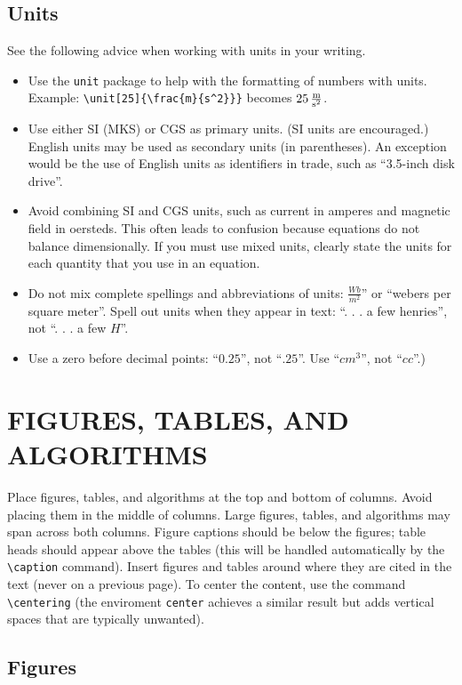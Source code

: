 \documentclass[letterpaper, 10 pt, conference]{ieeeconf}
\begin{document}
\subsection{Units}\label{sec:units}
See the following advice when working with units in your writing.
\begin{itemize}
\item Use the \texttt{unit} package to help with the formatting of
  numbers with units. Example: \verb|\unit[25]{\frac{m}{s^2}}}| becomes $\unit[25]{\frac{m}{s^2}}$.
\item Use either SI (MKS) or CGS as primary units. (SI units are encouraged.) English units may be used as secondary units (in parentheses). An exception would be the use of English units as identifiers in trade, such as ``3.5-inch disk drive''.
\item Avoid combining SI and CGS units, such as current in amperes and magnetic field in oersteds. This often leads to confusion because equations do not balance dimensionally. If you must use mixed units, clearly state the units for each quantity that you use in an equation.
\item Do not mix complete spellings and abbreviations of units: $\unit{\frac{Wb}{m^2}}$'' or ``webers per square meter''. Spell out units when they appear in text: ``. . . a few henries'', not ``. . . a few $\unit{H}$''.
\item Use a zero before decimal points: ``$0.25$'', not ``$.25$''. Use
  ``$\unit{cm^3}$'', not ``$\unit{cc}$''.)
\end{itemize}



\section{FIGURES, TABLES, AND ALGORITHMS}
Place figures, tables, and algorithms at the top and bottom of columns. Avoid placing them in the middle of columns. Large figures, tables, and algorithms may span across both columns. Figure captions should be below the figures; table heads should appear above the tables (this will be handled automatically by the \verb|\caption| command). Insert figures and tables around where they are cited in the text (never on a previous page). To center the content, use the command \verb|\centering| (the enviroment \verb|center| achieves a similar result but adds vertical spaces that are typically unwanted).

\subsection{Figures}
\end{document}
